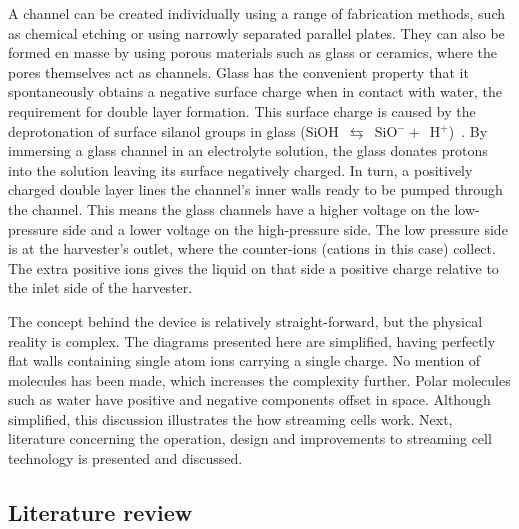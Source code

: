 
  A channel can be created individually using a range of fabrication methods, such as chemical etching or using narrowly separated parallel plates.
  They can also be formed en masse by using porous materials such as glass or ceramics, where the pores themselves act as channels.
  Glass has the convenient property that it spontaneously obtains a negative surface charge when in contact with water, the requirement for double layer formation.
  This surface charge is caused by the deprotonation of surface silanol groups in glass (SiOH~$\leftrightarrows$~SiO$^{-}+$~H$^{+}$)~\cite{Kirby2004}.
  By immersing a glass channel in an electrolyte solution, the glass donates protons into the solution leaving its surface negatively charged.
  In turn, a positively charged double layer lines the channel's inner walls ready to be pumped through the channel.
  This means the glass channels have a higher voltage on the low-pressure side and a lower voltage on the high-pressure side.
  The low pressure side is at the harvester's outlet, where the counter-ions (cations in this case) collect.
  The extra positive ions gives the liquid on that side a positive charge relative to the inlet side of the harvester.

  The concept behind the device is relatively straight-forward, but the physical reality is complex.
  The diagrams presented here are simplified, having perfectly flat walls containing single atom ions carrying a single charge.
  No mention of molecules has been made, which increases the complexity further.
  Polar molecules such as water have positive and negative components offset in space.
  Although simplified, this discussion illustrates the how streaming cells work.
  Next, literature concerning the operation, design and improvements to streaming cell technology is presented and discussed.


  \subsection{Literature review}
    \label{sub:background_streamingCells_literatureReview}


